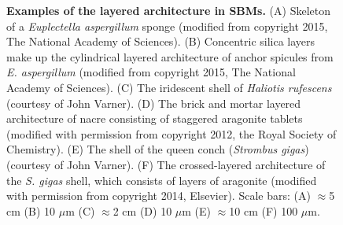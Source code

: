 \documentclass[12pt,onecolumn]{article}
\begin{document}
\begin{bibunit}
\begin{figure}[ht!]
			\caption{\textbf{Examples of the layered architecture in SBMs.} (A) Skeleton of a \textit{Euplectella aspergillum} sponge (modified from \cite{monn2015new} copyright 2015, The National Academy of Sciences). (B) Concentric silica layers make up the cylindrical layered architecture of anchor spicules from \textit{E. aspergillum} (modified from \cite{monn2015new} copyright 2015, The National Academy of Sciences). (C) The iridescent shell of \textit{Haliotis rufescens} (courtesy of John Varner). (D) The brick and mortar layered architecture of nacre consisting of staggered aragonite tablets (modified with permission from \cite{rabiei2012nacre} copyright 2012, the Royal Society of Chemistry). (E) The shell of the queen conch (\textit{Strombus gigas}) (courtesy of John Varner). (F) The crossed-layered architecture of the \textit{S. gigas} shell, which consists of layers of aragonite (modified with permission from \cite{osuna2014shell} copyright 2014, Elsevier). Scale bars: (A) $\approx$5 cm (B) 10  $\mu$m  (C) $\approx$2  cm  (D) 10 $\mu$m  (E) $\approx$10  cm  (F) 100 $\mu$m. } 	\label{fig:arch}
			\end{figure}


\end{bibunit}
\end{document}
